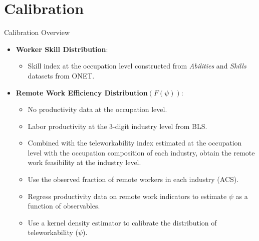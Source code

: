 \documentclass[aspectratio=1610]{beamer}
\begin{document}
\section{Calibration}
\begin{frame}[label=calibration_overview]{Calibration Overview}
    \begin{itemize}
        \item \textbf{Worker Skill Distribution}:
        \begin{itemize}
            \item Skill index at the occupation level constructed from \textit{Abilities} and \textit{Skills} datasets from ONET.\hyperlink{appendix_worker_skill}{}
        \end{itemize}

        \item \textbf{Remote Work Efficiency Distribution}$(F(\psi))$:
        \begin{itemize}
            \item No productivity data at the occupation level.
            \item Labor productivity at the 3-digit industry level from BLS.
            \item Combined with the teleworkability index estimated at the occupation level with the occupation composition of each industry, obtain the remote work feasibility at the industry level.
            \item Use the observed fraction of remote workers in each industry (ACS).
            \item Regress productivity data on remote work indicators to estimate $\psi$ as a function of observables. \hyperlink{appendix_calibration_psi_details}{}
            \item Use a kernel density estimator to calibrate the distribution of teleworkability (\(\psi\)).
        \end{itemize}
        
    \end{itemize}
\end{frame}
\end{document}
